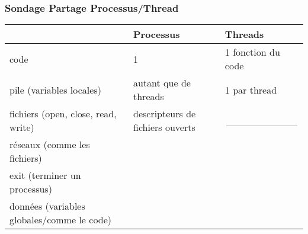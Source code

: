 \documentclass[11pt]{article}
\begin{document}
\subsubsection{Sondage Partage Processus/Thread}

\begin{table}[h!]
	\begin{tabular}{l|l|l|}
		\cline{2-3}
		                                                                 & Processus                        & Threads                                   \\ \hline
		\multicolumn{1}{|l|}{code}                                       & 1                                & 1 fonction du code                        \\ \hline
		\multicolumn{1}{|l|}{pile (variables locales)}                   & autant que de threads            & 1 par thread                              \\ \hline
		\multicolumn{1}{|l|}{fichiers (open, close, read, write)}        & descripteurs de fichiers ouverts & \multicolumn{1}{c|}{\_\_\_\_\_\_\_\_\_\_} \\ \hline
		\multicolumn{1}{|l|}{réseaux (comme les fichiers)}               &                                  &                                           \\ \hline
		\multicolumn{1}{|l|}{exit (terminer un processus)}               &                                  &                                           \\ \hline
		\multicolumn{1}{|l|}{données (variables globales/comme le code)} &                                  &                                           \\ \hline
	\end{tabular}
\end{table}
\end{document}
